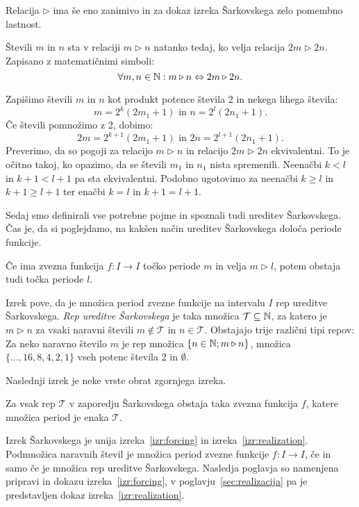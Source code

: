 \documentclass[../TG_magistrsko_delo_sections.tex]{subfiles}
\begin{document}
Relacija $\triangleright$ ima še eno zanimivo in za dokaz izreka Šarkovskega zelo pomembno lastnost.
\begin{trditev}\label{trd:doubling}
Števili $m$ in $n$ sta v relaciji $m \triangleright n$ natanko tedaj, ko velja relacija $2m \triangleright 2n$. Zapisano z matematičnimi simboli:
$$\forall m, n \in \mathbb N: m \triangleright n \Leftrightarrow 2m \triangleright 2n.$$
\end{trditev}
\begin{dokaz}
Zapišimo števili $m$ in $n$ kot produkt potence števila 2 in nekega lihega števila:
$$m= 2^k(2m_1 +1)\text{ in } n= 2^l(2n_1 +1).$$
Če števili pomnožimo z 2, dobimo:
$$2m= 2^{k+1}(2m_1 +1)\text{ in } 2n= 2^{l+1}(2n_1 +1).$$
Preverimo, da so pogoji za relacijo $m \triangleright n$ in relacijo $2m \triangleright 2n$ ekvivalentni. To je očitno takoj, ko opazimo, da se števili $m_1$ in $n_1$ nista spremenili. Neenačbi $k<l$ in $k+1<l+1$ pa sta ekvivalentni. Podobno ugotovimo za neenačbi $k \geq l$ in $k+1 \geq l+1$ ter enačbi $k=l$ in $k+1 = l+1$.
\end{dokaz}

Sedaj smo definirali vse potrebne pojme in spoznali tudi ureditev Šarkovskega. Čas je, da si poglejdamo, na kakšen način ureditev Šarkovskega določa periode funkcije.

\begin{izrek}\label{izr:forcing}
Če ima zvezna funkcija $f : I \to I$ točko periode $m$ in velja $ m \triangleright l$, potem obstaja tudi točka periode $l$.
\end{izrek}
Izrek pove, da je množica period zvezne funkcije na intervalu $I$ rep ureditve Šarkovskega. \emph{Rep ureditve Šarkovskega} je taka množica $\mathcal{T} \subseteq \mathbb N$, za katero je $m \triangleright n$ za  vsaki naravni števili $m \notin \mathcal{T}$ in $n \in \mathcal{T}$. Obstajajo trije različni tipi repov:  Za neko naravno število $m$ je rep množica $\{n \in \mathbb N; m \triangleright n\}$, množica $\{\dots, 16, 8, 4, 2, 1\}$ vseh potenc števila 2 in $\emptyset$.

Naslednji izrek je neke vrste obrat zgornjega izreka.

\begin{izrek}\label{izr:realization}
Za vsak rep $\mathcal{T}$ v zaporedju Šarkovskega obstaja taka zvezna funkcija $f$, katere množica period je enaka $\mathcal{T}$.
\end{izrek}

Izrek Šarkovskega je unija izreka~\ref{izr:forcing} in izreka~\ref{izr:realization}. Podmnožica naravnih števil je množica period zvezne funkcije $f:I \to I$, če in samo če je množica rep ureditve Šarkovskega. Nasledja poglavja so namenjena pripravi in dokazu izreka~\ref{izr:forcing}, v poglavju~\ref{sec:realizacija} pa je predstavljen dokaz izreka~\ref{izr:realization}.
\end{document}

